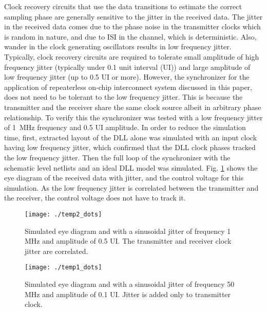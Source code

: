 \documentclass[journal,twoside,letterpaper]{IEEEtran}
\begin{document}
Clock recovery circuits that use the data transitions to estimate 
the correct sampling phase are generally sensitive to the jitter
in the received data. The jitter in the received data comes due to
the phase noise in the transmitter clocks which is random in nature,
and due to ISI in the channel, which is deterministic.
Also, wander in the clock generating
oscillators results in low frequency jitter. Typically, clock 
recovery circuits are required to tolerate small amplitude of 
high frequency jitter (typically under 0.1 unit interval (UI)) and large
amplitude of low frequency jitter (up to 0.5 UI or more). 
However, the synchronizer for the application of repeaterless on-chip interconnect 
system discussed in this paper, does not need to be tolerant to the low
frequency jitter. This is because the transmitter and the receiver share the same 
clock source albeit in arbitrary phase relationship. To verify this
the synchronizer was tested with a low frequency jitter of \mbox{1 MHz}
frequency and 0.5 UI amplitude. In order to reduce the simulation 
time, first, extracted layout of the DLL alone was simulated with
an input clock having low frequency jitter, which confirmed that the DLL clock
phases tracked the low frequency jitter. 
Then the full loop of the synchronizer with the schematic level
netlists and an ideal DLL model was simulated.
Fig. \ref{fig:data_1Mjitter} shows the eye diagram of the 
received data with jitter, and the control voltage  for this simulation. 
As the low frequency jitter is correlated between 
the transmitter and the receiver, the control 
voltage does not have to track it.
\begin{figure}[h!]
\centering
{}
\texttt{[image: ./temp2\_dots]}
\caption{Simulated eye diagram and  with a sinusoidal jitter of frequency 
1 MHz and amplitude of 0.5 UI. The transmitter and receiver clock 
jitter are correlated.}
\label{fig:data_1Mjitter}
\end{figure}
\begin{figure}[h!]
\centering
{}
\texttt{[image: ./temp1\_dots]}
\caption{Simulated eye diagram and  with a sinusoidal jitter of frequency
50 MHz and amplitude of 0.1 UI. Jitter is added only to transmitter clock.}
\label{fig:data_50Mjitter}
\end{figure}
\end{document}
